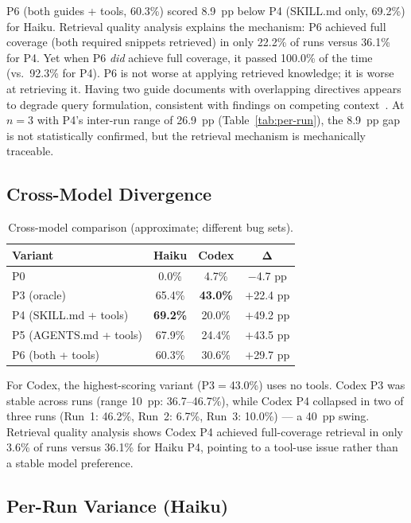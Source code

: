 \documentclass[10pt,conference]{IEEEtran}
\begin{document}
P6 (both guides + tools, 60.3\%) scored 8.9~pp below P4 (SKILL.md only, 69.2\%) for Haiku.
Retrieval quality analysis explains the mechanism: P6 achieved full coverage (both required snippets retrieved) in only 22.2\% of runs versus 36.1\% for P4.
Yet when P6 \emph{did} achieve full coverage, it passed 100.0\% of the time (vs.\ 92.3\% for P4).
P6 is not worse at applying retrieved knowledge; it is worse at retrieving it.
Having two guide documents with overlapping directives appears to degrade query formulation, consistent with findings on competing context~\cite{liu2023lostmiddle}.
At $n{=}3$ with P4's inter-run range of 26.9~pp (Table~\ref{tab:per-run}), the 8.9~pp gap is not statistically confirmed, but the retrieval mechanism is mechanically traceable.

\subsection{Cross-Model Divergence}
\label{sec:cross-model}

\begin{table}[t]
\centering
\caption{Cross-model comparison (approximate; different bug sets).}
\label{tab:cross-model}
\small
\begin{tabular}{@{}lccc@{}}
\toprule
\textbf{Variant} & \textbf{Haiku} & \textbf{Codex} & $\boldsymbol{\Delta}$ \\
\midrule
P0                     & 0.0\%  & 4.7\%  & $-$4.7 pp  \\
P3 (oracle)            & 65.4\% & \textbf{43.0\%} & $+$22.4 pp \\
P4 (SKILL.md + tools)  & \textbf{69.2\%} & 20.0\% & $+$49.2 pp \\
P5 (AGENTS.md + tools) & 67.9\% & 24.4\% & $+$43.5 pp \\
P6 (both + tools)      & 60.3\% & 30.6\% & $+$29.7 pp \\
\bottomrule
\end{tabular}
\end{table}

For Codex, the highest-scoring variant (P3$=$43.0\%) uses no tools.
Codex P3 was stable across runs (range 10~pp: 36.7--46.7\%), while Codex P4 collapsed in two of three runs (Run~1: 46.2\%, Run~2: 6.7\%, Run~3: 10.0\%) --- a 40~pp swing.
Retrieval quality analysis shows Codex P4 achieved full-coverage retrieval in only 3.6\% of runs versus 36.1\% for Haiku P4, pointing to a tool-use issue rather than a stable model preference.

\subsection{Per-Run Variance (Haiku)}
\label{sec:variance}
\end{document}

